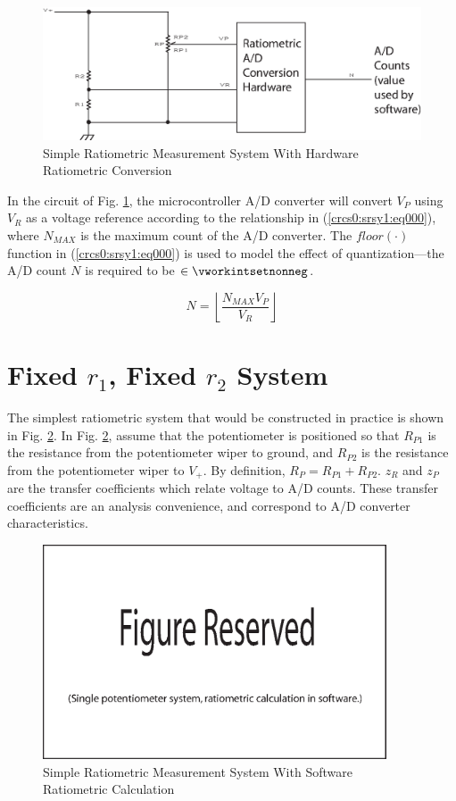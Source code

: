 \begin{figure}[!tb]
\centering
\includegraphics[width=4.6in]{c_rcs0/s_rsy1/smplsys0.eps}
\caption{Simple Ratiometric Measurement System With Hardware Ratiometric Conversion}
\label{crcs0:srsy1:smplsys0}
\end{figure}

In the circuit of Fig. \ref{crcs0:srsy1:smplsys0}, the microcontroller
A/D converter will convert $V_P$ using $V_R$ as a voltage
reference according to the relationship in (\ref{crcs0:srsy1:eq000}), where $N_{MAX}$
is the maximum count of the A/D converter.  The $floor(\cdot{})$
function in (\ref{crcs0:srsy1:eq000}) is used to model the effect of
quantization---the
A/D count $N$ is required to be $\in \vworkintsetnonneg$.

\begin{equation}
\label{crcs0:srsy1:eq000}
N = \left\lfloor { \frac{N_{MAX} V_P}{V_R} } \right\rfloor
\end{equation}



%
\section{Fixed $r_{1}$, Fixed $r_{2}$ System}
The simplest ratiometric system that would be constructed in practice
is shown in Fig. \ref{crcs0:srsy0:fr1fr2a}.
In Fig. \ref{crcs0:srsy0:fr1fr2a},
assume that the potentiometer is positioned so that
$R_{P1}$ is the resistance from the potentiometer wiper
to ground, and $R_{P2}$ is the resistance from the potentiometer
wiper to $V_{+}$.  By definition, $R_{P} = R_{P1} + R_{P2}$.  $z_R$ and
$z_P$ are the transfer coefficients which relate voltage to A/D counts.
These transfer coefficients are an analysis convenience, and correspond to
A/D converter characteristics.

\begin{figure}[!tb]
\centering
\includegraphics[height=2.5in]{c_rcs0/s_rsy0/smplsys0.eps}
\caption{Simple Ratiometric Measurement System With Software Ratiometric Calculation}
\label{crcs0:srsy0:fr1fr2a}
\end{figure}

